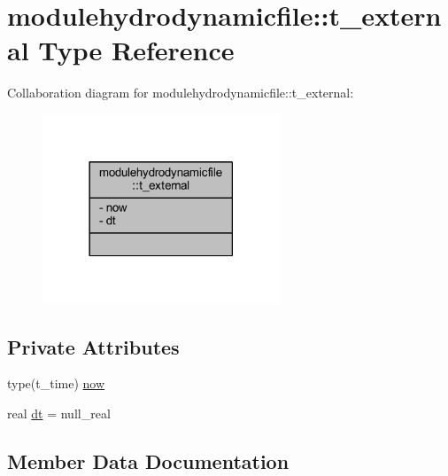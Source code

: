 \hypertarget{structmodulehydrodynamicfile_1_1t__external}{}\section{modulehydrodynamicfile\+:\+:t\+\_\+external Type Reference}
\label{structmodulehydrodynamicfile_1_1t__external}


Collaboration diagram for modulehydrodynamicfile\+:\+:t\+\_\+external\+:\nopagebreak
\begin{figure}[H]
\begin{center}
\leavevmode
\includegraphics[width=201pt]{structmodulehydrodynamicfile_1_1t__external__coll__graph}
\end{center}
\end{figure}
\subsection*{Private Attributes}
\begin{DoxyCompactItemize}
\item 
type(t\+\_\+time) \mbox{\hyperlink{structmodulehydrodynamicfile_1_1t__external_a5847d0b50d15e90f0f2fd2b38112ab18}{now}}
\item 
real \mbox{\hyperlink{structmodulehydrodynamicfile_1_1t__external_a279c45115963b12d00370e544ee0536c}{dt}} = null\+\_\+real
\end{DoxyCompactItemize}


\subsection{Member Data Documentation}
\mbox{\label{structmodulehydrodynamicfile_1_1t__external_a279c45115963b12d00370e544ee0536c}} 
